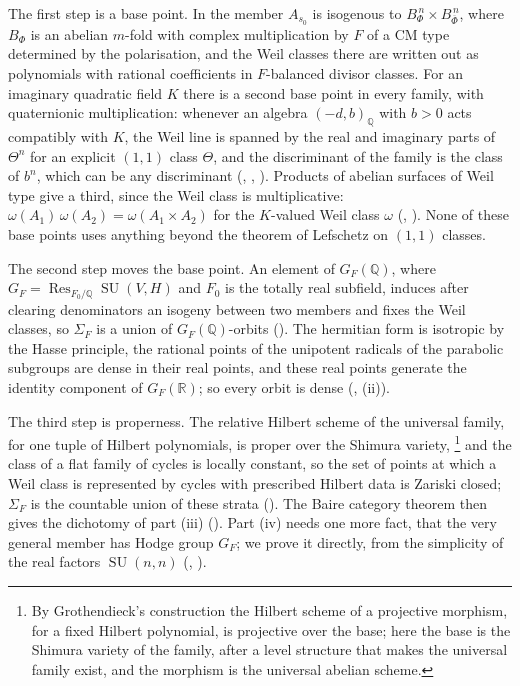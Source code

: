 \documentclass[11pt,reqno]{amsart}
\theoremstyle{plain}
\theoremstyle{definition}
\theoremstyle{remark}
\newcommand{\QQ}{\mathbb{Q}}
\newcommand{\RR}{\mathbb{R}}
\DeclareMathOperator{\Res}{Res}
\DeclareMathOperator{\SU}{SU}
\newcommand{\bbar}[1]{\overline{#1}}
\begin{document}
The first step is a base point. In  the member $A_{s_{0}}$
is isogenous to $B_{\Phi}^{\,n}\times B_{\bbar\Phi}^{\,n}$, where $B_{\Phi}$ is
an abelian $m$-fold with complex multiplication by $F$ of a CM type determined
by the polarisation, and the Weil classes there are written out as
polynomials with rational coefficients in $F$-balanced divisor classes. For
an imaginary quadratic field $K$ there is a second base point in every family,
with quaternionic multiplication: whenever an algebra $(-d,b)_{\QQ}$ with
$b>0$ acts compatibly with $K$, the Weil line is spanned by the real and
imaginary parts of $\Theta^{n}$ for an explicit $(1,1)$ class $\Theta$, and
the discriminant of the family is the class of $b^{n}$, which can be any
discriminant (, ,
). Products of abelian surfaces of Weil type give a
third, since the Weil class is multiplicative:
$\omega(A_{1})\,\omega(A_{2})=\omega(A_{1}\times A_{2})$ for the
$K$-valued Weil class $\omega$ (, ). None
of these base points uses anything beyond the theorem of Lefschetz on $(1,1)$
classes.

The second step moves the base point. An element of $G_{F}(\QQ)$, where
$G_{F}=\Res_{F_{0}/\QQ}\SU(V,H)$ and $F_{0}$ is the totally real subfield,
induces after clearing denominators an isogeny between two members and fixes
the Weil classes, so $\Sigma_{F}$ is a union of $G_{F}(\QQ)$-orbits
(). The hermitian form is isotropic by the Hasse
principle, the rational points of the unipotent radicals of the parabolic
subgroups are dense in their real points, and these real points generate the
identity component of $G_{F}(\RR)$; so every orbit is dense
(, (ii)).

The third step is properness. The relative Hilbert scheme of the universal
family, for one tuple of Hilbert polynomials, is proper over the Shimura
variety,%
\footnote{By Grothendieck's construction the Hilbert scheme of a projective
morphism, for a fixed Hilbert polynomial, is projective over the base; here
the base is the Shimura variety of the family, after a level structure that
makes the universal family exist, and the morphism is the universal abelian
scheme.}
and the class of a flat family of cycles is locally constant, so the
set of points at which a Weil class is represented by cycles with prescribed
Hilbert data is Zariski closed; $\Sigma_{F}$ is the countable union of these
strata (). The Baire category theorem then gives the
dichotomy of part (iii) (). Part (iv) needs one more
fact, that the very general member has Hodge group $G_{F}$; we prove it
directly, from the simplicity of the real factors $\SU(n,n)$
(, ).
\end{document}
